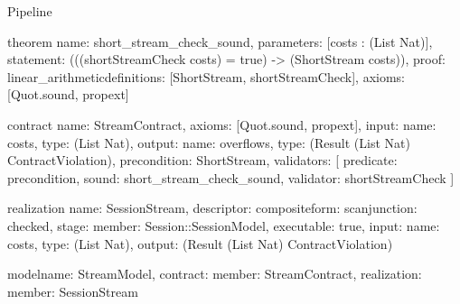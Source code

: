 \begin{lexlean}{Pipeline}
\begin{semanticmodule}
theorem{
  name: short_stream_check_sound,
  parameters: [costs : (List Nat)],
  statement: (((shortStreamCheck costs) = true) -> (ShortStream costs)),
  proof: linear_arithmetic{definitions: [ShortStream, shortStreamCheck]},
  axioms: [Quot.sound, propext]
}

contract{
  name: StreamContract,
  axioms: [Quot.sound, propext],
  input: {name: costs, type: (List Nat)},
  output: {name: overflows, type: (Result (List Nat) ContractViolation)},
  precondition: ShortStream,
  validators: [
    {predicate: precondition, sound: short_stream_check_sound, validator: shortStreamCheck}
  ]
}

realization{
  name: SessionStream,
  descriptor: composite{form: scan{junction: checked{}, stage: {member: Session::SessionModel}}},
  executable: true,
  input: {name: costs, type: (List Nat)},
  output: (Result (List Nat) ContractViolation)
}

model{name: StreamModel, contract: {member: StreamContract}, realization: {member: SessionStream}}
\end{semanticmodule}
\end{lexlean}
